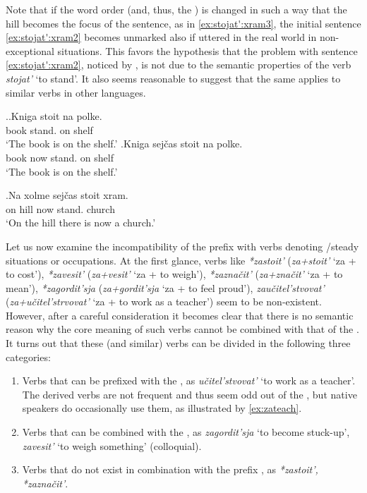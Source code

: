 Note that if the word order (and, thus, the ) is changed in such a way that the hill becomes the focus of the sentence, as in \ref{ex:stojat':xram3}, the initial sentence \ref{ex:stojat':xram2} becomes unmarked also if uttered in the real world in non-exceptional situations. This favors the hypothesis that the problem with  sentence \ref{ex:stojat':xram2}, noticed by \citet{Paducheva:96}, is not due to the semantic properties of the verb \textit{stojat'} `to stand'. It also seems reasonable to suggest that the same applies to similar verbs in other languages. 

\ex.\label{ex:stojat':kniga}\ag.Kniga stoit na polke.\\
book stand. on shelf\\
\trans `The book is on the shelf.'
\bg.Kniga sej\v{c}as stoit na polke.\\
book now stand. on shelf\\
\trans `The book is on the shelf.'

\exg.\label{ex:stojat':xram3}Na xolme sej\v{c}as stoit xram.\\
on hill now stand. church\\
\trans `On the hill there is now a church.'

Let us now examine the incompatibility of the  prefix  with verbs denoting /steady situations or occupations. At the first glance, verbs like \textit{*zastoit'} (\textit{za+stoit'} `za + to cost'), \textit{*zavesit'} (\textit{za+vesit'} `za + to weigh'), \textit{*zazna\v{c}it'} (\textit{za+zna\v{c}it'} `za + to mean'), \textit{*zagordit'sja} (\textit{za+gordit'sja} `za + to feel proud'), \textit{zau\v{c}itel'stvovat'} (\textit{za+u\v{c}itel'strvovat'} `za + to work as a teacher') seem to be non-existent. However, after a careful consideration it becomes clear that there is no semantic reason why the core meaning of such verbs cannot be combined with that of the  . It turns out that these (and similar) verbs can be divided in the following three categories:

\begin{enumerate}
\item Verbs that can be prefixed with the  , as \textit{u\v{c}itel'stvovat'} `to work as a teacher'. The derived  verbs are not frequent and thus seem odd out of the , but native speakers do occasionally use them, as illustrated by \ref{ex:zateach}.
\item Verbs that can be combined with the  , as \textit{zagordit'sja} `to become stuck-up', \textit{zavesit'} `to weigh something' (colloquial).
\item Verbs that do not exist in combination with the prefix , as \textit{*zastoit', *zazna\v{c}it'}.
\end{enumerate}

